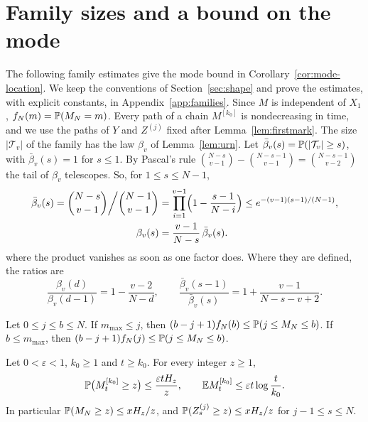\section{Family sizes and a bound on the mode}\label{app:shape}

The following family estimates give the mode bound in Corollary~\ref{cor:mode-location}. We keep the conventions of Section~\ref{sec:shape} and prove the estimates, with explicit constants, in Appendix~\ref{app:families}.
Since $M$ is independent of $X_1$,
$f_N(m)=\mathbb{P}(M_N=m)$. Every path of a chain $M^{[k_0]}$ is nondecreasing in
time, and we use the paths of $Y$ and $Z^{(j)}$ fixed after
Lemma~\ref{lem:firstmark}. The size $\lvert\mathcal T_v\rvert$ of the family has the law $\beta_v$ of
Lemma~\ref{lem:urn}. Let $\bar\beta_v(s)=\mathbb{P}(\lvert\mathcal T_v\rvert\ge s)$,
with $\bar\beta_v(s)=1$ for $s\le1$. By Pascal's rule
$\binom{N-s}{v-1}-\binom{N-s-1}{v-1}=\binom{N-s-1}{v-2}$ the tail of $\beta_v$
telescopes. So, for $1\le s\le N-1$,
\begin{equation}\label{eq:B-subtail}
\begin{aligned}
 \bar\beta_v(s)=\binom{N-s}{v-1}\bigg/\binom{N-1}{v-1}
 &=\prod_{i=1}^{v-1}\Bigl(1-\frac{s-1}{N-i}\Bigr)\le e^{-(v-1)(s-1)/(N-1)},\\
 \beta_v(s)&=\frac{v-1}{N-s}\,\bar\beta_v(s).
\end{aligned}
\end{equation}
where the product vanishes as soon as one factor does. Where they are defined,
the ratios are
\begin{equation}\label{eq:B-ratio}
 \frac{\beta_v(d)}{\beta_v(d-1)}=1-\frac{v-2}{N-d},\qquad
 \frac{\bar\beta_v(s-1)}{\bar\beta_v(s)}=1+\frac{v-1}{N-s-v+2}.
\end{equation}

\begin{lemma}\label{lem:B-sandwich}
Let $0\le j\le b\le N$. If $m_{\max}\le j$, then $(b-j+1)f_N(b)\le\mathbb{P}(j\le M_N\le
b)$. If $b\le m_{\max}$, then $(b-j+1)f_N(j)\le\mathbb{P}(j\le M_N\le b)$.
\end{lemma}


\begin{lemma}\label{lem:B-tail}
Let $0<\varepsilon<1$, $k_0\ge1$ and $t\ge k_0$. For every integer $z\ge1$,
\[
 \mathbb{P}\bigl(M^{[k_0]}_t\ge z\bigr)\le\frac{\varepsilon tH_z}{z},\qquad
 \mathbb{E} M^{[k_0]}_t\le\varepsilon t\log\frac t{k_0}.
\]
In particular $\mathbb{P}(M_N\ge z)\le xH_z/z$, and $\mathbb{P}(Z^{(j)}_s\ge z)\le
xH_z/z$ for $j-1\le s\le N$.
\end{lemma}


